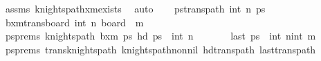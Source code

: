 \begin{isabellebody}
\ assms\ knights{\isacharunderscore}{\kern0pt}path{\isacharunderscore}{\kern0pt}{}xm{\isacharunderscore}{\kern0pt}exists\ \isamarkupfalse%
\ auto\isanewline
\ \ \isamarkupfalse%
\ {\isacharquery}{\kern0pt}pstrans{\isacharunderscore}{\kern0pt}path\ {\isacharparenleft}{\kern0pt}int\ {\isacharparenleft}{\kern0pt}n{\isacharminus}{\kern0pt}{}{\isacharparenright}{\kern0pt}{\isacharcomma}{\kern0pt}{}{\isacharparenright}{\kern0pt}\ ps\isanewline
\ \ \isamarkupfalse%
\ {\isacharquery}{\kern0pt}b{}xm{\isacharprime}{\kern0pt}{\isacharequal}{\kern0pt}{\isachardoublequoteopen}trans{\isacharunderscore}{\kern0pt}board\ {\isacharparenleft}{\kern0pt}int\ {\isacharparenleft}{\kern0pt}n{\isacharminus}{\kern0pt}{}{\isacharparenright}{\kern0pt}{\isacharcomma}{\kern0pt}{}{\isacharparenright}{\kern0pt}\ {\isacharparenleft}{\kern0pt}board\ {}\ m{\isacharparenright}{\kern0pt}{\isachardoublequoteclose}\isanewline
\ \ \isamarkupfalse%
\ psprems{\isacharcolon}{\kern0pt}\ {\isachardoublequoteopen}knights{\isacharunderscore}{\kern0pt}path\ {\isacharquery}{\kern0pt}b{}xm{\isacharprime}{\kern0pt}\ {\isacharquery}{\kern0pt}ps\ {\isachardoublequoteopen}hd\ {\isacharquery}{\kern0pt}ps\ {\isacharequal}{\kern0pt}\ {\isacharparenleft}{\kern0pt}int\ {\isacharparenleft}{\kern0pt}n{\isacharminus}{\kern0pt}{}{\isacharparenright}{\kern0pt}{\isacharplus}{\kern0pt}{}{\isacharcomma}{\kern0pt}{}{\isacharparenright}{\kern0pt}{\isachardoublequoteclose}\ \isanewline
\ \ \ \ \ \ {\isachardoublequoteopen}last\ {\isacharquery}{\kern0pt}ps\ {\isacharequal}{\kern0pt}\ {\isacharparenleft}{\kern0pt}int\ {\isacharparenleft}{\kern0pt}n{\isacharminus}{\kern0pt}{}{\isacharparenright}{\kern0pt}{\isacharplus}{\kern0pt}{}{\isacharcomma}{\kern0pt}int\ m{\isacharminus}{\kern0pt}{}{\isacharparenright}{\kern0pt}{\isachardoublequoteclose}\isanewline
\ \ \ \ \isamarkupfalse%
\ psprems\ trans{\isacharunderscore}{\kern0pt}knights{\isacharunderscore}{\kern0pt}path\ knights{\isacharunderscore}{\kern0pt}path{\isacharunderscore}{\kern0pt}non{\isacharunderscore}{\kern0pt}nil\ hd{\isacharunderscore}{\kern0pt}trans{\isacharunderscore}{\kern0pt}path\ last{\isacharunderscore}{\kern0pt}trans{\isacharunderscore}{\kern0pt}path\ \isamarkupfalse%

\end{isabellebody}
